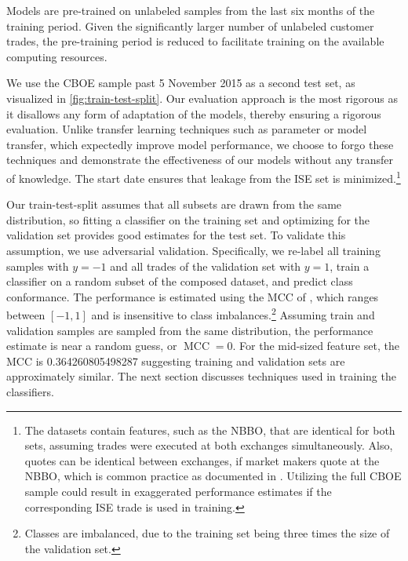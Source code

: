 Models are pre-trained on unlabeled samples from the last six months of the training period. Given the significantly larger number of unlabeled customer trades, the pre-training period is reduced to facilitate training on the available computing resources.

We use the \gls{CBOE} sample past 5 November 2015 as a second test set, as visualized in \cref{fig:train-test-split}. Our evaluation approach is the most rigorous as it disallows any form of adaptation of the models, thereby ensuring a rigorous evaluation. Unlike transfer learning techniques such as parameter or model transfer, which expectedly improve model performance, we choose to forgo these techniques and demonstrate the effectiveness of our models without any transfer of knowledge. The start date ensures that leakage from the \gls{ISE} set is minimized.\footnote{The datasets contain features, such as the \gls{NBBO}, that are identical for both sets, assuming trades were executed at both exchanges simultaneously. Also, quotes can be identical between exchanges, if market makers quote at the \gls{NBBO}, which is common practice as documented in \textcite[][10]{securitiesandexchangecommissionReportConcerningExaminations2007}. Utilizing the full \gls{CBOE} sample could result in exaggerated performance estimates if the corresponding \gls{ISE} trade is used in training.}

Our train-test-split assumes that all subsets are drawn from the same distribution, so fitting a classifier on the training set and optimizing for the validation set provides good estimates for the test set. To validate this assumption, we use adversarial validation. Specifically, we re-label all training samples with $y=-1$ and all trades of the validation set with $y=1$, train a classifier on a random subset of the composed dataset, and predict class conformance. The performance is estimated using the \gls{MCC} of \textcite[][445]{matthewsComparisonPredictedObserved1975}, which ranges between $\left[-1, 1\right]$ and is insensitive to class imbalances.\footnote{Classes are imbalanced, due to the training set being three times the size of the validation set.} Assuming train and validation samples are sampled from the same distribution, the performance estimate is near a random guess, or $\operatorname{MCC} = 0$. For the mid-sized feature set, the \gls{MCC} is \num{0.364260805498287} suggesting training and validation sets are approximately similar. The next section discusses techniques used in training the classifiers.

